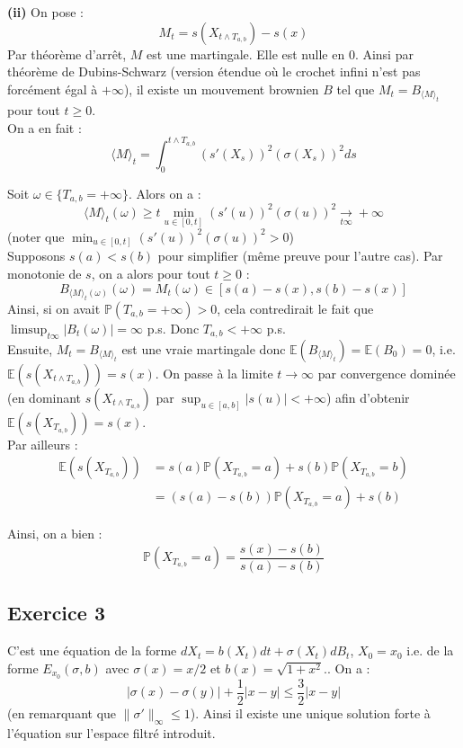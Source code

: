 \documentclass[a4paper,12pt]{article}
\newcommand{\E}{\mathbb{E}}
\newcommand{\prob}{\mathbb{P}}
\begin{document}
\textbf{(ii)} On pose :
$$M_t = s(X_{t \wedge T_{a,b}}) - s(x)$$
Par théorème d'arrêt, $M$ est une martingale. Elle est nulle en $0$. Ainsi par théorème de Dubins-Schwarz (version étendue où le crochet infini n'est pas forcément égal à $+\infty$), il existe un mouvement brownien $B$ tel que $M_t = B_{\langle M \rangle_t}$ pour tout $t \geq 0$. \\

On a en fait :
$$\langle M \rangle_t = \int_0^{t \wedge T_{a,b}} (s'(X_s))^2 (\sigma (X_s))^2 ds$$

Soit $\omega \in \{T_{a,b} = + \infty\}$. Alors on a :
$$\langle M \rangle_t (\omega) \geq t \min_{u \in [0,t]} (s'(u))^2 (\sigma (u))^2 \xrightarrow[t \infty]{} + \infty$$
(noter que $\min_{u \in [0,t]} (s'(u))^2 (\sigma (u))^2 > 0$) \\

Supposons $s(a)<s(b)$ pour simplifier (même preuve pour l'autre cas). Par monotonie de $s$, on a alors pour tout $t \geq 0$ : 
$$B_{\langle M \rangle_t (\omega )} (\omega ) = M_t( \omega) \in [s(a) - s(x), s(b)-s(x)]$$
Ainsi, si on avait $\prob (T_{a,b} = +\infty) > 0$, cela contredirait le fait que $\limsup_{t \infty} |B_t (\omega)| = \infty$ p.s. Donc $T_{a,b} < +\infty$ p.s. \\

Ensuite, $M_t = B_{\langle M \rangle_t}$ est une vraie martingale donc $\E (B_{\langle M \rangle_t}) = \E (B_0)=0$, i.e. $\E (s(X_{t \wedge T_{a,b}})) = s(x)$. On passe à la limite $t \longrightarrow \infty$ par convergence dominée (en dominant $s(X_{t \wedge T_{a,b}})$ par $\sup_{u \in [a,b]} |s(u)| < + \infty$) afin d'obtenir $\E (s(X_{T_{a,b}})) = s(x)$. \\

Par ailleurs :
\begin{align*}
\E (s(X_{T_{a,b}})) & = s(a) \prob (X_{T_{a,b}} = a) + s(b) \prob (X_{T_{a,b}} = b) \\
& = (s(a)-s(b)) \prob (X_{T_{a,b}} = a) + s(b)
\end{align*}

Ainsi, on a bien :
$$ \prob (X_{T_{a,b}} = a) = \frac{s(x) - s(b)}{s(a)-s(b)} $$

\subsection{Exercice 3}
C'est une équation de la forme $dX_t = b(X_t)dt+\sigma(X_t)dB_t$, $X_0=x_0$ i.e. de la forme $E_{x_0} (\sigma, b)$ avec $\sigma(x)=x/2$ et $b(x)=\sqrt{1+x^2}$.. On a :
$$|\sigma(x)-\sigma(y)| + \frac{1}{2}|x-y| \leq \frac{3}{2} |x-y|$$
(en remarquant que $\|\sigma'\|_{\infty} \leq 1$).
Ainsi il existe une unique solution forte à l'équation sur l'espace filtré introduit. \\
\end{document}
